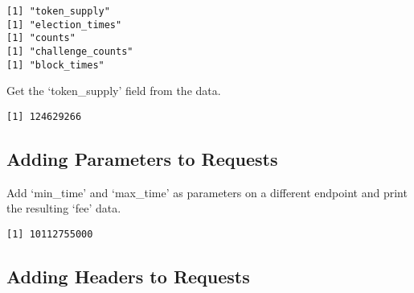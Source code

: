 \documentclass[
  letterpaper,
  DIV=11,
  numbers=noendperiod]{scrartcl}
\newenvironment{Shaded}{\begin{snugshade}}{\end{snugshade}}
\newcommand{\AttributeTok}[1]{\textcolor[rgb]{0.40,0.45,0.13}{#1}}
\newcommand{\FunctionTok}[1]{\textcolor[rgb]{0.28,0.35,0.67}{#1}}
\newcommand{\NormalTok}[1]{\textcolor[rgb]{0.00,0.23,0.31}{#1}}
\newcommand{\OtherTok}[1]{\textcolor[rgb]{0.00,0.23,0.31}{#1}}
\newcommand{\SpecialCharTok}[1]{\textcolor[rgb]{0.37,0.37,0.37}{#1}}
\newcommand{\StringTok}[1]{\textcolor[rgb]{0.13,0.47,0.30}{#1}}
\begin{document}
\begin{verbatim}
[1] "token_supply"
[1] "election_times"
[1] "counts"
[1] "challenge_counts"
[1] "block_times"
\end{verbatim}

Get the `token\_supply' field from the data.

\begin{Shaded}
\end{Shaded}

\begin{verbatim}
[1] 124629266
\end{verbatim}

\hypertarget{adding-parameters-to-requests}{%
\subsection{Adding Parameters to
Requests}\label{adding-parameters-to-requests}}

Add `min\_time' and `max\_time' as parameters on a different endpoint
and print the resulting `fee' data.

\begin{Shaded}
\end{Shaded}

\begin{verbatim}
[1] 10112755000
\end{verbatim}

\hypertarget{adding-headers-to-requests}{%
\subsection{Adding Headers to
Requests}\label{adding-headers-to-requests}}
\end{document}
